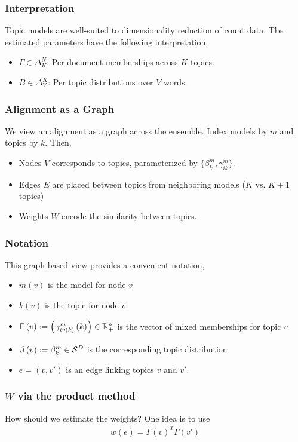 \documentclass{beamer}
\begin{document}
\begin{frame}
  \frametitle{Interpretation}
Topic models are well-suited to dimensionality reduction of count data. The
estimated parameters have the following interpretation,
\begin{itemize}
  \item $\Gamma \in \Delta_{K}^{N}$: Per-document memberships across $K$ topics.
  \item $B \in \Delta_{V}^{K}$: Per topic distributions over $V$ words.
\end{itemize}
\end{frame}

\begin{frame}
  \frametitle{Alignment as a Graph}
  We view an alignment as a graph across the ensemble. Index models by $m$ and
  topics by $k$. Then,

  \begin{itemize}
    \item Nodes $V$ corresponds to topics, parameterized by $\{\beta^m_{k},
    \gamma^m_{ik}\}$.
    \item Edges $E$ are placed between topics from neighboring models ($K$ vs.
    $K + 1$ topics)
    \item Weights $W$ encode the similarity between topics.
  \end{itemize}
\end{frame}

\begin{frame}
  \frametitle{Notation}
  This graph-based view provides a convenient notation,
  \begin{itemize}
  \item $m\left(v\right)$ is the model for node $v$
  \item $k\left(v\right)$ is the topic for node $v$
  \item $\Gamma\left(v\right) := \left(\gamma_{i
  v\left(k\right)}^m\left(k\right)\right) \in \mathbb{R}^n_{+}$ is the vector of
  mixed memberships for topic $v$
  \item $\beta\left(v\right) := \beta_{k}^m \in \mathcal{S}^{D}$ is the
  corresponding topic distribution
  \item $e = \left(v, v'\right)$ is an edge linking topics $v$ and $v'$.
  \end{itemize}
\end{frame}

\begin{frame}
  \frametitle{$W$ via the product method}
How should we estimate the weights? One idea is to use
\begin{align*}
w\left(e\right) = \Gamma\left(v\right)^T\Gamma\left(v'\right)
\end{align*}
\end{frame}
\end{document}
